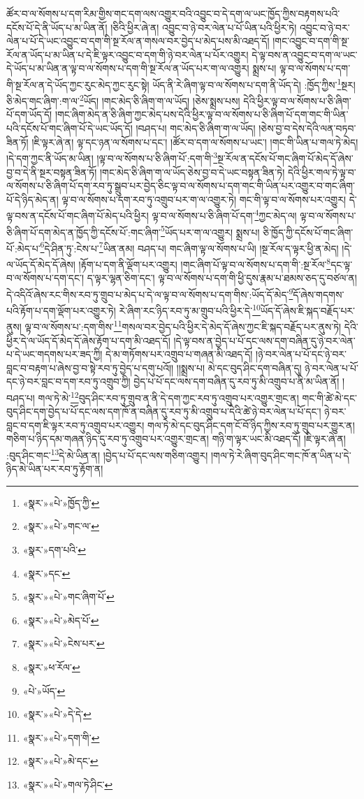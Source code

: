 ཚོར་བ་ལ་སོགས་པ་དག་རིམ་གྱིས་གང་དག་ལས་འགྱུར་བའི་འབྱུང་བ་དེ་དག་ལ་ཡང་ཁྱོད་ཀྱིས་བརྟགས་པའི་དངོས་པོ་དེ་ནི་ཡོད་པ་མ་ཡིན་ནོ། །ཅིའི་ཕྱིར་ཞེ་ན། འབྱུང་བ་ཉེ་བར་ལེན་པ་པོ་ཡིན་པའི་ཕྱིར་ཏེ། འབྱུང་བ་ཉེ་བར་ལེན་པ་པོ་དེ་ཡང་འབྱུང་བ་དག་གི་སྔ་རོལ་ན་གསལ་བར་བྱེད་པ་མེད་པས་མི་འཐད་དོ། །གང་འབྱུང་བ་དག་གི་སྔ་རོལ་ན་ཡོད་པ་མ་ཡིན་པ་དེ་ཇི་ལྟར་འབྱུང་བ་དག་གི་ཉེ་བར་ལེན་པ་པོར་འགྱུར། དེ་ལྟ་བས་ན་འབྱུང་བ་དག་ལ་ཡང་དེ་ཡོད་པ་མ་ཡིན་ན་ལྟ་བ་ལ་སོགས་པ་དག་གི་སྔ་རོལ་ན་ཡོད་པར་ག་ལ་འགྱུར། སྨྲས་པ། ལྟ་བ་ལ་སོགས་པ་དག་གི་སྔ་རོལ་ན་དེ་ཡོད་ཀྱང་རུང་མེད་ཀྱང་རུང་སྟེ། ཡོད་ནི་རེ་ཞིག་ལྟ་བ་ལ་སོགས་པ་དག་ནི་ཡོད་དེ། :ཁྱོད་ཀྱིས་\footnote{«སྣར་»«པེ་»ཁྱོད་ཀྱི་}སྔར། ཅི་མེད་གང་ཞིག་:ག་ལ་\footnote{«སྣར་»«པེ་»གང་ལ་}ཡོད། །གང་མེད་ཅི་ཞིག་ག་ལ་ཡོད། །ཅེས་སྨྲས་པས། དེའི་ཕྱིར་ལྟ་བ་ལ་སོགས་པ་ཅི་ཞིག་པོ་དག་ཡོད་དོ། །གང་ཞིག་མེད་ན་ཅི་ཞིག་ཀྱང་མེད་པས་དེའི་ཕྱིར་ལྟ་བ་ལ་སོགས་པ་ཅི་ཞིག་པོ་དག་གང་གི་ཡིན་པའི་དངོས་པོ་གང་ཞིག་པོ་དེ་ཡང་ཡོད་དོ། །བཤད་པ། གང་མེད་ཅི་ཞིག་ག་ལ་ཡོད། །ཅེས་བྱ་བ་དེས་དེའི་ལན་བཏབ་ཟིན་ཏོ། །ཇི་ལྟར་ཞེ་ན། ལྟ་དང་ཉན་ལ་སོགས་པ་དང་། །ཚོར་བ་དག་ལ་སོགས་པ་ཡང་། །གང་གི་ཡིན་པ་གལ་ཏེ་མེད། །དེ་དག་ཀྱང་ནི་ཡོད་མ་ཡིན། །ལྟ་བ་ལ་སོགས་པ་ཅི་ཞིག་པོ་:དག་གི་\footnote{«སྣར་»དག་པའི་}སྔ་རོལ་ན་དངོས་པོ་གང་ཞིག་པོ་མེད་དོ་ཞེས་བྱ་བ་དེ་ནི་སྔར་བསྟན་ཟིན་ཏོ། །གང་མེད་ཅི་ཞིག་ག་ལ་ཡོད་ཅེས་བྱ་བ་དེ་ཡང་བསྟན་ཟིན་ཏེ། དེའི་ཕྱིར་གལ་ཏེ་ལྟ་བ་ལ་སོགས་པ་ཅི་ཞིག་པོ་དག་རབ་ཏུ་སྒྲུབ་པར་བྱེད་ཅིང་ལྟ་བ་ལ་སོགས་པ་དག་གང་གི་ཡིན་པར་འགྱུར་བ་གང་ཞིག་པོ་དེ་ཉིད་མེད་ན། ལྟ་བ་ལ་སོགས་པ་དག་རབ་ཏུ་འགྲུབ་པར་ག་ལ་འགྱུར་ཏེ། གང་གི་ལྟ་བ་ལ་སོགས་པར་འགྱུར། དེ་ལྟ་བས་ན་དངོས་པོ་གང་ཞིག་པོ་མེད་པའི་ཕྱིར། ལྟ་བ་ལ་སོགས་པ་ཅི་ཞིག་པོ་དག་\footnote{«སྣར་»དང་}ཀྱང་མེད་ལ། ལྟ་བ་ལ་སོགས་པ་ཅི་ཞིག་པོ་དག་མེད་ན་ཁྱོད་ཀྱི་དངོས་པོ་:གང་ཞིག་\footnote{«སྣར་»«པེ་»གང་ཞིག་པོ་}ཡོད་པར་ག་ལ་འགྱུར། སྨྲས་པ། ཅི་ཁྱོད་ཀྱི་དངོས་པོ་གང་ཞིག་པོ་:མེད་པ་\footnote{«སྣར་»«པེ་»མེད་པོ་}དེ་ཤིན་ཏུ་:ངེས་པ་\footnote{«སྣར་»«པེ་»ངེས་པར་}ཡིན་ནམ། བཤད་པ། གང་ཞིག་ལྟ་ལ་སོགས་པ་ཡི། །སྔ་རོལ་ད་ལྟར་ཕྱི་ན་མེད། །དེ་ལ་ཡོད་དོ་མེད་དོ་ཞེས། །རྟོག་པ་དག་ནི་ལྡོག་པར་འགྱུར། །གང་ཞིག་པོ་ལྟ་བ་ལ་སོགས་པ་དག་གི་:སྔ་རོལ་\footnote{«སྣར་»ཕ་རོལ་}དང་ལྟ་བ་ལ་སོགས་པ་དག་དང་། ད་ལྟར་ལྷན་ཅིག་དང་། ལྟ་བ་ལ་སོགས་པ་དག་གི་ཕྱི་དུས་རྣམ་པ་ཐམས་ཅད་དུ་བཙལ་ན། དེ་འདིའོ་ཞེས་རང་གིས་རབ་ཏུ་གྲུབ་པ་མེད་པ་དེ་ལ་ལྟ་བ་ལ་སོགས་པ་དག་གིས་:ཡོད་དོ་མེད་\footnote{«པེ་»ཡོད་}དོ་ཞེས་གདགས་པའི་རྟོག་པ་དག་ལྡོག་པར་འགྱུར་ཏེ། རེ་ཞིག་རང་ཉིད་རབ་ཏུ་མ་གྲུབ་པའི་ཕྱིར་དེ་\footnote{«སྣར་»«པེ་»དེ་དེ་}ཡོད་དོ་ཞེས་ཇི་སྐད་བརྗོད་པར་ནུས། ལྟ་བ་ལ་སོགས་པ་:དག་གིས་\footnote{«སྣར་»«པེ་»དག་གི་}གསལ་བར་བྱེད་པའི་ཕྱིར་དེ་མེད་དོ་ཞེས་ཀྱང་ཇི་སྐད་བརྗོད་པར་ནུས་ཏེ། དེའི་ཕྱིར་དེ་ལ་ཡོད་དོ་མེད་དོ་ཞེས་རྟོག་པ་དག་མི་འཐད་དོ། །དེ་ལྟ་བས་ན་བྱེད་པ་པོ་དང་ལས་དག་བཞིན་དུ་ཉེ་བར་ལེན་པ་དེ་ཡང་གདགས་པར་ཟད་ཀྱི། དེ་མ་གཏོགས་པར་འགྲུབ་པ་གཞན་མི་འཐད་དོ། །ཉེ་བར་ལེན་པ་པོ་དང་ཉེ་བར་བླང་བ་བརྟག་པ་ཞེས་བྱ་བ་སྟེ་རབ་ཏུ་བྱེད་པ་དགུ་པའོ།། །།སྨྲས་པ། མེ་དང་བུད་ཤིང་དག་བཞིན་དུ། ཉེ་བར་ལེན་པ་པོ་དང་ཉེ་བར་བླང་བ་དག་རབ་ཏུ་འགྲུབ་ཀྱི། བྱེད་པ་པོ་དང་ལས་དག་བཞིན་དུ་རབ་ཏུ་མི་འགྲུབ་པ་ནི་མ་ཡིན་ནོ། །བཤད་པ། གལ་ཏེ་མེ་\footnote{«སྣར་»«པེ་»མེ་དང་}བུད་ཤིང་རབ་ཏུ་གྲུབ་ན་ནི་དེ་དག་ཀྱང་རབ་ཏུ་འགྲུབ་པར་འགྱུར་གྲང་ན། གང་གི་ཚེ་མེ་དང་བུད་ཤིང་དག་བྱེད་པ་པོ་དང་ལས་དག་ཁོ་ན་བཞིན་དུ་རབ་ཏུ་མི་འགྲུབ་པ་དེའི་ཚེ་ཉེ་བར་ལེན་པ་པོ་དང་། ཉེ་བར་བླང་བ་དག་ཇི་ལྟར་རབ་ཏུ་འགྲུབ་པར་འགྱུར། གལ་ཏེ་མེ་དང་བུད་ཤིང་དག་ངོ་བོ་ཉིད་ཀྱིས་རབ་ཏུ་གྲུབ་པར་གྱུར་ན། གཅིག་པ་ཉིད་དམ་གཞན་ཉིད་དུ་རབ་ཏུ་འགྲུབ་པར་འགྱུར་གྲང་ན། གཉི་ག་ལྟར་ཡང་མི་འཐད་དོ། །ཇི་ལྟར་ཞེ་ན། :བུད་ཤིང་གང་\footnote{«སྣར་»«པེ་»གལ་ཏེ་ཤིང་}དེ་མེ་ཡིན་ན། །བྱེད་པ་པོ་དང་ལས་གཅིག་འགྱུར། །གལ་ཏེ་རེ་ཞིག་བུད་ཤིང་གང་ཁོ་ན་ཡིན་པ་དེ་ཉིད་མེ་ཡིན་པར་རབ་ཏུ་རྟོག་ན། 